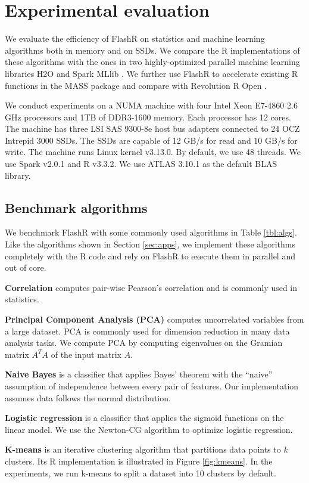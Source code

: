 \section{Experimental evaluation}
We evaluate the efficiency of FlashR on statistics and machine learning
algorithms both in memory and on SSDs. We compare the R implementations of
these algorithms with the ones in two highly-optimized parallel machine learning
libraries H2O \cite{h2o} and Spark MLlib \cite{mllib}. We further use FlashR
to accelerate existing R functions in the MASS package and compare with
Revolution R Open \cite{rro}.

We conduct experiments on a NUMA machine with
four Intel Xeon E7-4860 2.6 GHz processors and 1TB of 
DDR3-1600 memory. Each processor has 12 cores. The machine has three LSI SAS 9300-8e
host bus adapters connected to
24 OCZ Intrepid 3000 SSDs. The SSDs are capable of
12 GB/s for read and 10 GB/s for write. The machine runs
Linux kernel v3.13.0. By default, we use 48 threads. 
We use Spark v2.0.1 and R v3.3.2. We use ATLAS 3.10.1 as the default BLAS library.

\subsection{Benchmark algorithms}
We benchmark FlashR with some commonly used algorithms in Table
\ref{tbl:algs}. Like the algorithms shown in Section \ref{sec:apps},
we implement these algorithms completely with the R code and
rely on FlashR to execute them in parallel and out of core.

\noindent \textbf{Correlation} computes pair-wise Pearson's correlation
\cite{cor} and is commonly used in statistics.

\noindent \textbf{Principal Component Analysis (PCA)} computes uncorrelated
variables from a large dataset. PCA is commonly used for dimension reduction
in many data analysis tasks. We compute PCA by computing eigenvalues on the Gramian
matrix $A^T A$ of the input matrix $A$.

\noindent \textbf{Naive Bayes} is a classifier that applies Bayes' theorem
with the ``naive'' assumption of independence between every pair of features.
Our implementation assumes data follows the normal distribution.

\noindent \textbf{Logistic regression} is a classifier that applies
the sigmoid functions on the linear model. We use the Newton-CG algorithm
to optimize logistic regression.

\noindent \textbf{K-means} is an iterative clustering algorithm that
partitions data points to $k$ clusters. Its R implementation is illustrated
in Figure \ref{fig:kmeans}. In the experiments, we run k-means to split
a dataset into 10 clusters by default.

